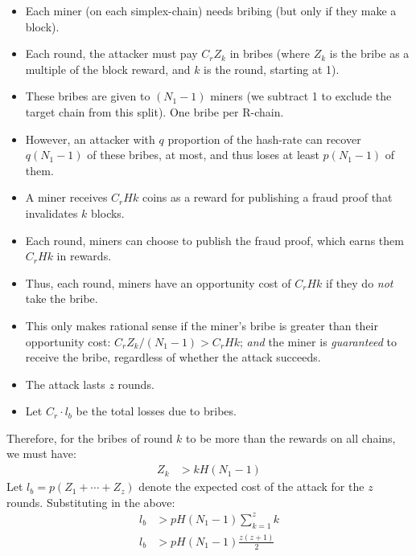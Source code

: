 \begin{itemize}
    \item Each miner (on each simplex-chain) needs bribing (but only if they make a block).
    \item Each round, the attacker must pay $C_r Z_k$ in bribes (where $Z_k$ is the bribe as a multiple of the block reward, and $k$ is the round, starting at 1).
    \item These bribes are given to $(N_1 - 1)$ miners (we subtract 1 to exclude the target chain from this split). One bribe per R-chain.
    \item However, an attacker with $q$ proportion of the hash-rate can recover $q(N_1 - 1)$ of these bribes, at most, and thus loses at least $p(N_1 - 1)$ of them.
    \item A miner receives $C_r H k$ coins as a reward for publishing a fraud proof that invalidates $k$ blocks.
    \item Each round, miners can choose to publish the fraud proof, which earns them $C_r H k$ in rewards.
    \item Thus, each round, miners have an opportunity cost of $C_r H k$ if they do \emph{not} take the bribe.
    \item This only makes rational sense if the miner's bribe is greater than their opportunity cost: $C_r Z_k / (N_1 - 1) > C_r H k$; \emph{and} the miner is \emph{guaranteed} to receive the bribe, regardless of whether the attack succeeds.
    \item The attack lasts $z$ rounds.
    \item Let $C_r \cdot l_b$ be the total losses due to bribes.
\end{itemize}

Therefore, for the bribes of round $k$ to be more than the rewards on all chains, we must have:
\begin{align}
    Z_k &> k H (N_1-1) \nonumber
\end{align}
Let $l_b = p (Z_1 + \cdots + Z_z)$ denote the expected cost of the attack for the $z$ rounds. Substituting in the above:
\begin{align}
    l_b &> p H (N_1-1) \sum\limits_{k=1}^z k \nonumber \\
    l_b &> p H (N_1-1) \frac{z (z+1)}{2}
        \label{eq:spv-atk-losses-bribes}
\end{align}

